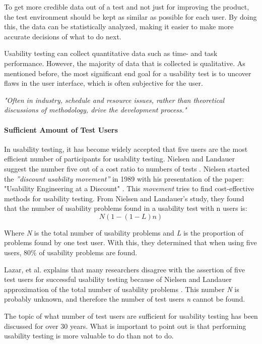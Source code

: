 To get more credible data out of a test and not just for improving the product, the test environment should be kept as similar as possible for each user. By doing this, the data can be statistically analyzed, making it easier to make more accurate decisions of what to do next.

Usability testing can collect quantitative data such as time- and task performance. However, the majority of data that is collected is qualitative. As mentioned before, the most significant end goal for a usability test is to uncover flaws in the user interface, which is often subjective for the user. 

\textit{"Often in industry, schedule and resource issues, rather than theoretical discussions of methodology, drive the development process."} \cite{wixon2003evaluating}

\paragraph{Sufficient Amount of Test Users}
\label{ssub:Sufficient Amount of Test Users}

In usability testing, it has become widely accepted that five users are the most efficient number of participants for usability testing.  Nielsen and Landauer suggest the number five out of a cost ratio to numbers of tests \cite{nielsen1993mathematical}. Nielsen started the \textit{''discount usability movement''} in 1989 with his presentation of the paper: "Usability Engineering at a Discount" \cite{experienceDiscountUsability20}. This \textit{movement} tries to find cost-effective methods for usability testing. 
From Nielsen and Landauer's study, they found that the number of usability problems found in a usability test with n users is:
\[ N (1-(1- L ) n ) \]

Where \textit{N} is the total number of usability problems and  \textit{L} is the proportion of problems found by one test user. With this, they determined that when using five users, 80\% of usability problems are found.

Lazar, et al. explains that many researchers disagree with the assertion of five test users for successful usability testing because of Nielsen and Landauer approximation of the total number of usability problems \cite[Chapter~10.5.3]{lazar2017research}. This number \textit{N} is probably unknown, and therefore the number of test users \textit{n} cannot be found.

The topic of what number of test users are sufficient for usability testing has been discussed for over 30 years. What is important to point out is that performing usability testing is more valuable to do than not to do. 


